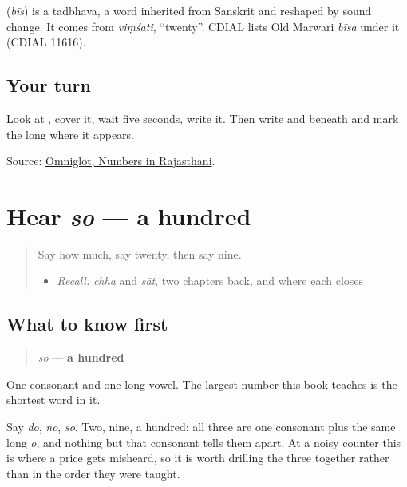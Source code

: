 \begin{cousinweb}
\textbf{} (\emph{bīs}) is a tadbhava, a word inherited from Sanskrit and reshaped by sound change. It comes from \emph{viṃśati}, \textquotedblleft{}twenty\textquotedblright{}. CDIAL lists Old Marwari \emph{bīsa} under it (CDIAL 11616).
\end{cousinweb}

\subsection*{Your turn}
Look at \textbf{}, cover it, wait five seconds, write it. Then write \textbf{} and \textbf{} beneath and mark the long \textbf{} where it appears.

\begin{tcolorbox}[breakable,colback=teal!4,colframe=teal!35!black,title={Before you move on}]
Source: \href{https://www.omniglot.com/language/numbers/rajasthani.htm}{Omniglot, Numbers in Rajasthani}.
\end{tcolorbox}
\section[so]{Hear \emph{so} — a hundred}

\label{lesson:MW-C34-hear-so}



\begin{quote}
Say how much, say twenty, then say nine.

\begin{itemize}
\raggedright
  \item \emph{Recall:} \emph{chha} and \emph{sāt}, two chapters back, and where each closes
\end{itemize}
\end{quote}

\subsection*{What to know first}
\begin{quote}
\emph{so} — \textbf{a hundred}
\end{quote}

One consonant and one long vowel. The largest number this book teaches is the shortest word in it.

Say \emph{do}, \emph{no}, \emph{so}. Two, nine, a hundred: all three are one consonant plus the same long \emph{o}, and nothing but that consonant tells them apart. At a noisy counter this is where a price gets misheard, so it is worth drilling the three together rather than in the order they were taught.

